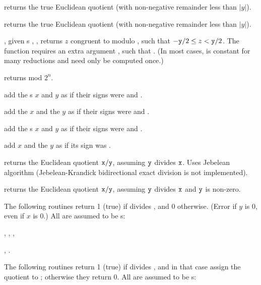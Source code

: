  returns the true Euclidean quotient
(with non-negative remainder less than $|y|$).

 returns the true Euclidean quotient
(with non-negative remainder less than $|y|$).

, given
s , , returns $z$ congruent to  modulo ,
such that $-{\tt y}/2 \leq z < {\tt y}/2$. The function requires an extra
argument , such that . (In most cases, 
is constant for many reductions and  need only be computed once.)

 returns  mod $2^n$.

 add the s
$x$ and $y$ as if their signs were  and .

add the  $x$ and the  $y$ as if their signs were 
and .

 add the s $x$
and $y$ as if their signs were  and .

 add $x$ and the  $y$
as if its sign was .


 returns the Euclidean quotient
${\tt x} / {\tt y}$, assuming ${\tt y}$ divides ${\tt x}$. Uses Jebelean
algorithm (Jebelean-Krandick bidirectional exact division is not
implemented).

 returns the Euclidean quotient
${\tt x} / {\tt y}$, assuming ${\tt y}$ divides
${\tt x}$ and ${\tt y}$ is non-zero.

The following routines return 1 (true) if  divides , and
0 otherwise. (Error if $y$ is $0$, even if $x$ is $0$.) All  are assumed
to be s:

,
,
,

,
.

The following routines return 1 (true) if  divides , and in
that case assign the quotient to ; otherwise they return 0. All
 are assumed to be s:

